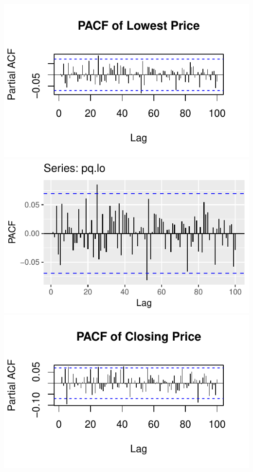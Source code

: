 \documentclass[]{tufte-book}
\begin{document}
\includegraphics{binary-forex-trading-Q1_files/figure-latex/acf-pacf-7}
\includegraphics{binary-forex-trading-Q1_files/figure-latex/acf-pacf-8}
\includegraphics{binary-forex-trading-Q1_files/figure-latex/acf-pacf-9}
\end{document}
